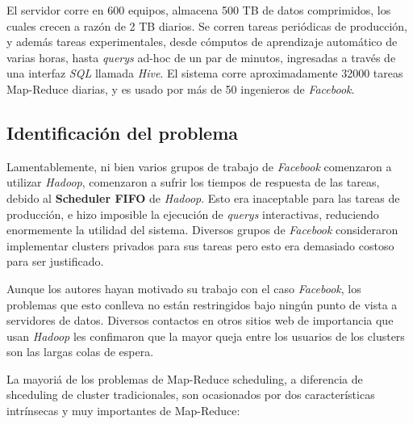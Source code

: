 \vspace{2mm}

El servidor corre en 600 equipos, almacena 500 TB de datos comprimidos, los cuales crecen a raz\'on de 2 TB diarios. Se corren tareas peri\'odicas de producci\'on, y adem\'as tareas experimentales, desde c\'omputos de aprendizaje autom\'atico de varias horas, hasta \emph{querys} ad-hoc de un par de minutos, ingresadas a trav\'es de una interfaz \emph{SQL} llamada \emph{Hive}. El sistema corre aproximadamente 32000 tareas Map-Reduce diarias, y es usado por m\'as de 50 ingenieros de \emph{Facebook}.

\subsection{Identificaci\'on del problema}

Lamentablemente, ni bien varios grupos de trabajo de \emph{Facebook} comenzaron a utilizar \emph{Hadoop}, comenzaron a sufrir los tiempos de respuesta de las tareas, debido al \textbf{Scheduler FIFO} de \emph{Hadoop}. Esto era inaceptable para las tareas de producci\'on, e hizo imposible la ejecuci\'on de \emph{querys} interactivas, reduciendo enormemente la utilidad del sistema. Diversos grupos de \emph{Facebook} consideraron implementar clusters privados para sus tareas pero esto era demasiado costoso para ser justificado. 

\vspace{2mm}

Aunque los autores hayan motivado su trabajo con el caso \emph{Facebook}, los problemas que esto conlleva no est\'an restringidos bajo ning\'un punto de vista a servidores de datos. Diversos contactos en otros sitios web de importancia que usan \emph{Hadoop} les confimaron que la mayor queja entre los usuarios de los clusters son las largas colas de espera.

\vspace{2mm}

La mayori\'a de los problemas de Map-Reduce scheduling, a diferencia de shceduling de cluster tradicionales, son ocasionados por dos caracter\'isticas intr\'insecas y muy importantes de Map-Reduce:

